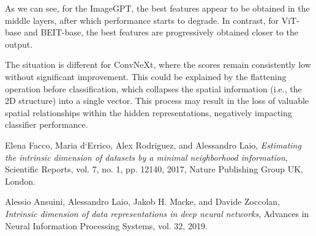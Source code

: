 \documentclass[
  11pt,
  a4paper,
  onecolumn]{article}
\begin{document}
As we can see, for the ImageGPT, the best features appear to be obtained in the middle layers, after which performance starts to degrade. In contrast, for ViT-base and BEIT-base, the best features are progressively obtained closer to the output.  

The situation is different for ConvNeXt, where the scores remain consistently low without significant improvement. This could be explained by the flattening operation before classification, which collapses the spatial information (i.e., the 2D structure) into a single vector. This process may result in the loss of valuable spatial relationships within the hidden representations, negatively impacting classifier performance.

\vspace{50pt}
\begin{thebibliography}{9}

Elena Facco, Maria d`Errico, Alex Rodriguez, and Alessandro Laio,
\textit{Estimating the intrinsic dimension of datasets by a minimal neighborhood information},
Scientific Reports, vol. 7, no. 1, pp. 12140, 2017, Nature Publishing Group UK, London.

  Alessio Ansuini, Alessandro Laio, Jakob H. Macke, and Davide Zoccolan,
  \textit{Intrinsic dimension of data representations in deep neural networks},
  Advances in Neural Information Processing Systems, vol. 32, 2019.

\end{thebibliography}
\end{document}
